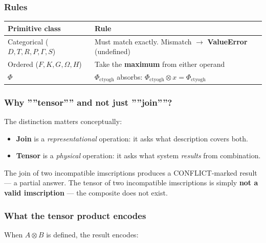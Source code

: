 \documentclass[12pt,a4paper]{article}
\begin{document}
\subsubsection{Rules}

\begin{table}[htbp]
\centering
\small
{}
\begin{tabularx}{\textwidth}{>{\centering\arraybackslash}X >{\centering\arraybackslash}X}
\toprule
\rowcolor{gray!25}\textbf{Primitive class} & \textbf{Rule} \\
\midrule
\rowcolors{1}{white}{gray!10}
Categorical ($D, T, R, P, \Gamma, S$) & Must match exactly. Mismatch $\rightarrow$ \textbf{ValueError} (undefined) \\
Ordered ($F, K, G, \Omega, H$) & Take the \textbf{maximum} from either operand \\
$\Phi$ & $\Phi_{\text{ctyogh}}$ absorbs: $\Phi_{\text{ctyogh}} \otimes x = \Phi_{\text{ctyogh}}$ \\
\bottomrule
\end{tabularx}
\end{table}

\subsubsection{Why ''''tensor'''' and not just ''''join''''?}

The distinction matters conceptually:

\begin{itemize}
    \item \textbf{Join} is a \emph{representational} operation: it asks what description covers both.
    \item \textbf{Tensor} is a \emph{physical} operation: it asks what system \emph{results} from combination.
\end{itemize}

The join of two incompatible imscriptions produces a CONFLICT-marked result --- a partial answer. The tensor of two incompatible imscriptions is simply \textbf{not a valid imscription} --- the composite does not exist.

\subsubsection{What the tensor product encodes}

When $A \otimes B$ is defined, the result encodes:
\end{document}
